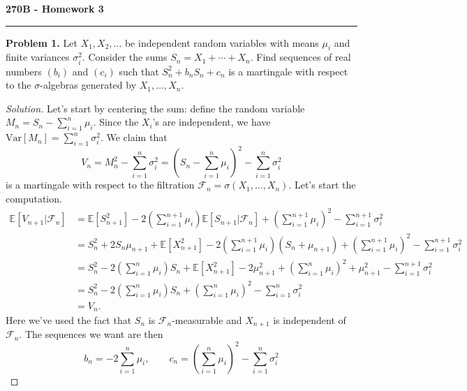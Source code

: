\documentclass[11pt,letterpaper]{report}
\newcommand{\mcal}[1]{\mathcal{#1}}
\newcommand{\E}{\mathbb{E}}
\newcommand{\Var}{\text{Var}}
\newenvironment{solution}
{\begin{proof}[Solution]}
{\end{proof}}
\begin{document}
\begin{center}
{\bf \Large 270B - Homework 3}
\vspace{0.2cm}
\hrule
\end{center}

\noindent\textbf{Problem 1. }
Let $X_1, X_2, \ldots$ be independent random variables with means $\mu_i$ and finite variances $\sigma_i^2$. Consider the sums $S_n = X_1 + \cdots + X_n$. Find sequences of real numbers $(b_i)$ and $(c_i)$ such that $S_n^2 + b_nS_n + c_n$ is a martingale with respect to the $\sigma$-algebras generated by $X_1, \ldots, X_n$.
\begin{solution}
	Let's start by centering the sum: define the random variable $M_n = S_n - \sum_{i=1}^n \mu_i$. Since the $X_i$'s are independent, we have $\Var[M_n] = \sum_{i=1}^n \sigma_i^2$. We claim that
	\[
	V_n = M_n^2 - \sum_{i=1}^n\sigma_i^2 = \left(S_n - \sum_{i=1}^n\mu_i\right)^2 - \sum_{i=1}^n\sigma_i^2
	\]
	is a martingale with respect to the filtration $\mcal{F}_n = \sigma(X_1, \ldots, X_n)$. Let's start the computation.
	\begin{align*}
		\E[V_{n+1}|\mcal{F}_n] &= \E[S_{n+1}^2] - 2\left(\sum_{i=1}^{n+1}\mu_i\right)\E[S_{n+1}|\mcal{F}_n] + \left(\sum_{i=1}^{n+1}\mu_i\right)^2 - \sum_{i=1}^{n+1}\sigma_i^2\\
		&= S_n^2 + 2S_n\mu_{n+1} + \E[X_{n+1}^2] - 2\left(\sum_{i=1}^{n+1}\mu_i\right)(S_n + \mu_{n+1}) + \left(\sum_{i=1}^{n+1}\mu_i\right)^2 - \sum_{i=1}^{n+1}\sigma_i^2\\
		&= S_n^2 -2\left(\sum_{i=1}^n\mu_i\right)S_n + \E[X_{n+1}^2] - 2\mu_{n+1}^2 + \left(\sum_{i=1}^n\mu_i\right)^2 + \mu_{n+1}^2 - \sum_{i=1}^{n+1}\sigma_i^2\\
		&= S_n^2 - 2\left(\sum_{i=1}^n\mu_i\right)S_n + \left(\sum_{i=1}^n\mu_i\right)^2 - \sum_{i=1}^n\sigma_i^2\\
		&= V_n.
	\end{align*}
	Here we've used the fact that $S_n$ is $\mcal{F}_n$-measurable and $X_{n+1}$ is independent of $\mcal{F}_n$. The sequences we want are then
	\[
	b_n = -2\sum_{i=1}^n\mu_i,\qquad c_n = \left(\sum_{i=1}^n\mu_i\right)^2 - \sum_{i=1}^n\sigma_i^2
	\]
\end{solution}
\end{document}
